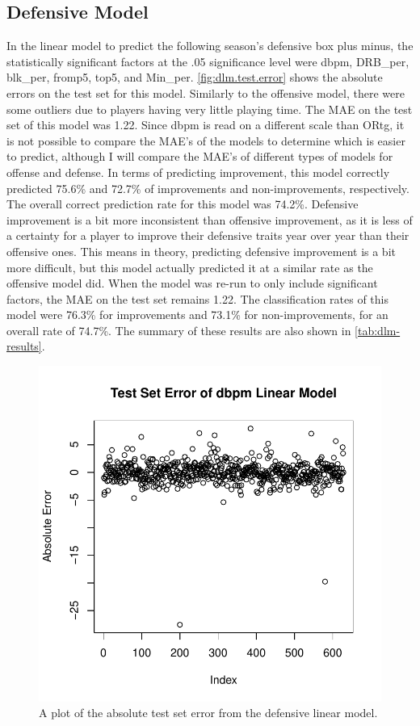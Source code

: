 \documentclass[12pt]{article}
\begin{document}
\subsection{Defensive Model}
\label{subsec:dlm}
In the linear model to predict the following season's defensive box plus minus, the statistically significant factors at the .05 significance level were dbpm, DRB\_per, blk\_per, fromp5, top5, and Min\_per. \autoref{fig:dlm.test.error} shows the absolute errors on the test set for this model. Similarly to the offensive model, there were some outliers due to players having very little playing time. The MAE on the test set of this model was 1.22. Since dbpm is read on a different scale than ORtg, it is not possible to compare the MAE's of the models to determine which is easier to predict, although I will compare the MAE's of different types of models for offense and defense. In terms of predicting improvement, this model correctly predicted 75.6\% and 72.7\% of improvements and non-improvements, respectively. The overall correct prediction rate for this model was 74.2\%. Defensive improvement is a bit more inconsistent than offensive improvement, as it is less of a certainty for a player to improve their defensive traits year over year than their offensive ones. This means in theory, predicting defensive improvement is a bit more difficult, but this model actually predicted it at a similar rate as the offensive model did. When the model was re-run to only include significant factors, the MAE on the test set remains 1.22. The classification rates of this model were 76.3\% for improvements and 73.1\% for non-improvements, for an overall rate of 74.7\%. The summary of these results are also shown in \autoref{tab:dlm-results}.


\begin{figure}[tbp]
	\centering
	\includegraphics[width=\textwidth]{dlm.test.error}
	\caption{A plot of the absolute test set error from the defensive linear model.}
	\label{fig:dlm.test.error}
\end{figure}
\end{document}
